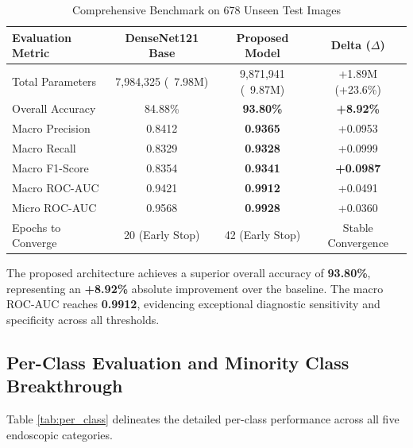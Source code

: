 \documentclass[conference]{IEEEtran}
\begin{document}
\begin{table}[htbp]
\caption{Comprehensive Benchmark on 678 Unseen Test Images}
\label{tab:comparison}
\begin{center}
\begin{tabular}{lccc}
\toprule
\textbf{Evaluation Metric} & \textbf{DenseNet121 Base} & \textbf{Proposed Model} & \textbf{Delta ($\Delta$)} \\
\midrule
Total Parameters & 7,984,325 (~7.98M) & 9,871,941 (~9.87M) & +1.89M (+23.6\%) \\
Overall Accuracy & 84.88\% & \textbf{93.80\%} & \textbf{+8.92\%} \\
Macro Precision & 0.8412 & \textbf{0.9365} & +0.0953 \\
Macro Recall & 0.8329 & \textbf{0.9328} & +0.0999 \\
Macro F1-Score & 0.8354 & \textbf{0.9341} & \textbf{+0.0987} \\
Macro ROC-AUC & 0.9421 & \textbf{0.9912} & +0.0491 \\
Micro ROC-AUC & 0.9568 & \textbf{0.9928} & +0.0360 \\
Epochs to Converge & 20 (Early Stop) & 42 (Early Stop) & Stable Convergence \\
\bottomrule
\end{tabular}
\end{center}
\end{table}

The proposed architecture achieves a superior overall accuracy of \textbf{93.80\%}, representing an \textbf{+8.92\%} absolute improvement over the baseline. The macro ROC-AUC reaches \textbf{0.9912}, evidencing exceptional diagnostic sensitivity and specificity across all thresholds.

\subsection{Per-Class Evaluation and Minority Class Breakthrough}
Table \ref{tab:per_class} delineates the detailed per-class performance across all five endoscopic categories.
\end{document}
